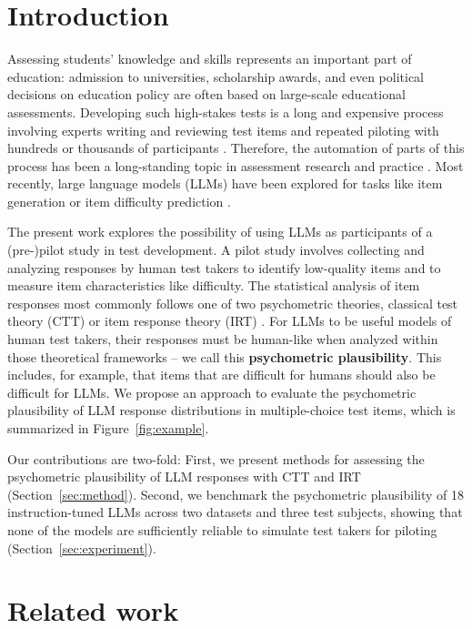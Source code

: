 \documentclass[11pt]{article}
\begin{document}
\section{Introduction}
\label{sec:introduction}

Assessing students' knowledge and skills represents an important part of education: admission to universities, scholarship awards, and even political decisions on education policy are often based on large-scale educational assessments. Developing such high-stakes tests is a long and expensive process involving experts writing and reviewing test items and repeated piloting with hundreds or thousands of participants \citep{Green2020,Papageorgiou2021}. Therefore, the automation of parts of this process has been a long-standing topic in assessment research and practice \citep{Haladyna2013,Kurdi2019}. Most recently, large language models (LLMs) have been explored for tasks like item generation or item difficulty prediction \citep{Attali2022,Yaneva2024,Owan2023,May2025}.

The present work explores the possibility of using LLMs as participants of a (pre-)pilot study in test development. A pilot study involves collecting and analyzing responses by human test takers to identify low-quality items and to measure item characteristics like difficulty. The statistical analysis of item responses most commonly follows one of two psychometric theories, classical test theory (CTT) or item response theory (IRT) \citep{Chang2021}. For LLMs to be useful models of human test takers, their responses must be human-like when analyzed within those theoretical frameworks -- we call this \textbf{psychometric plausibility}. This includes, for example, that items that are difficult for humans should also be difficult for LLMs. We propose an approach to evaluate the psychometric plausibility of LLM response distributions in multiple-choice test items, which is summarized in Figure~\ref{fig:example}.

Our contributions are two-fold: First, we present methods for assessing the psychometric plausibility of LLM responses with CTT and IRT (Section~\ref{sec:method}). Second, we benchmark the psychometric plausibility of 18 instruction-tuned LLMs across two datasets and three test subjects, showing that none of the models are sufficiently reliable to simulate test takers for piloting (Section~\ref{sec:experiment}).

\section{Related work}
\end{document}
